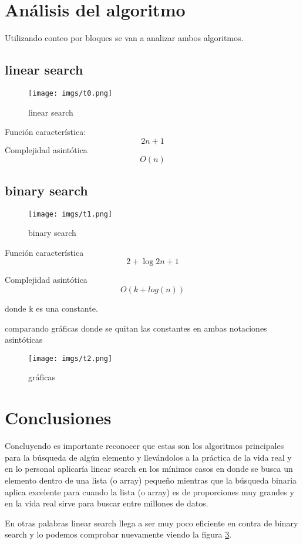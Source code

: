 \documentclass{article}
\begin{document}
\begin{multicols}{2}
\section{Análisis del algoritmo}\label{AdA}
  Utilizando conteo por bloques se van a analizar ambos algoritmos.
  \subsection*{linear search}
  \begin{figure}[H]
    \texttt{[image: imgs/t0.png]}
    \caption{linear search}
    \label{Fig:1}
  \end{figure}
  Función característica: 
  \begin{equation*}
    2n + 1
  \end{equation*}
  Complejidad asintótica
  \begin{equation*}
    O(n)
  \end{equation*}

  \subsection*{binary search}
  \begin{figure}[H]
    \texttt{[image: imgs/t1.png]}
    \caption{binary search}
    \label{Fig:2}
  \end{figure}

    Función característica
    \begin{equation*}
      2 + \log2 n+1
    \end{equation*}

    Complejidad asintótica
    \begin{equation*}
      O(k + log(n))
    \end{equation*}

    donde k es una constante.

    comparando gráficas donde se quitan las constantes en ambas notaciones asintóticas

    \begin{figure}[H]
      \centering
      \texttt{[image: imgs/t2.png]}
      \caption{gráficas}
      \label{Fig:3}
    \end{figure}
\section{Conclusiones}\label{Conclusiones}				%
Concluyendo es importante reconocer que estas son los algoritmos principales para la búsqueda de algún
elemento y llevándolos a la práctica de la vida real y en lo personal aplicaría linear search en los mínimos casos
en donde se busca un elemento dentro de una lista (o array) pequeño mientras que la búsqueda binaria aplica excelente para cuando
la lista (o array) es de proporciones muy grandes y en la vida real sirve para buscar entre millones de datos.

En otras palabras linear search llega a ser muy poco eficiente en contra de binary search y lo podemos comprobar nuevamente
 viendo la figura \ref{Fig:3}.
\end{multicols}
\end{document}
